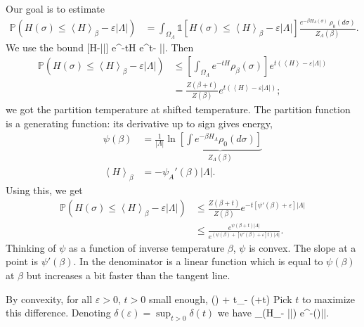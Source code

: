\documentclass[12pt]{book}
\theoremstyle{norm}
\begin{document}
Our goal is to estimate 
\begin{align*}
\mathbb{P}(H(\sigma)\le \left\langle {H}\right\rangle_\beta - \varepsilon |\Lambda|)
&=\int_{\Omega_\Lambda} \mathds{1}[H(\sigma)\le \left\langle {H}\right\rangle_\beta - \varepsilon |\Lambda|] \frac{e^{-\beta H_\Lambda(\sigma)}\,\rho_0(d\sigma)}{Z_{\Lambda}(\beta)}.
\end{align*}
We use the bound 
\be
{}[H\le \left{}\right\rangle-\varepsilon |\Lambda|] \le e^{-tH} e^{t\left{}\right\rangle - \varepsilon|\Lambda|}.
\ee
Then 
\begin{align*}
\mathbb{P}(H(\sigma)\le \left\langle {H}\right\rangle_\beta - \varepsilon |\Lambda|)
&\le \left[ {\int_{\Omega_\Lambda} e^{-tH}\rho_{\beta}(\sigma)} \right] e^{t(\left\langle {H}\right\rangle-\varepsilon|\Lambda|)}\\
&= \frac{Z(\beta+t)}{Z(\beta)}e^{t(\left\langle {H}\right\rangle-\varepsilon|\Lambda|)};
\end{align*}
we got the partition temperature at shifted temperature.
The partition function is a generating function: its derivative up to sign gives energy,
\begin{align*}
\psi(\beta) &= \frac{1}{|\Lambda|}\ln \underbrace{\left[ { \int e^{-\beta H_\Lambda} \rho_0(d\sigma)} \right]}_{Z_{\Lambda}(\beta)}\\
\left\langle {H}\right\rangle_\beta &= -\psi_A'(\beta) |\Lambda|.
\end{align*}
Using this, we get
\begin{align*}
\mathbb{P}(H(\sigma)\le \left\langle {H}\right\rangle_\beta - \varepsilon |\Lambda|)&\le 
\frac{Z(\beta+t)}{Z(\beta)}e^{-t[\psi'(\beta)+\varepsilon]|\Lambda|}\\
&\le \frac{e^{\psi(\beta+t)|\Lambda|}}{e^{(\psi(\beta) + [\psi'(\beta) + \varepsilon]t)|\Lambda|}}.%
\end{align*}
Thinking of $\psi$ as a function of inverse temperature $\beta$, $\psi$ is convex. The slope at a point is $\psi'(\beta)$. In the denominator is a linear function which is equal to $\psi(\beta)$ at $\beta$ but increases a bit faster than the tangent line.

By convexity, for all $\varepsilon>0$, $t>0$ small enough, %
\be
\psi(\beta) + t_ - \psi(\beta+t) 
\ee
Pick $t$ to maximize this difference. Denoting $\delta(\varepsilon)=\sup_{t>0}\delta(t)$ we have
\be
{}_\beta (H_\Lambda\le \left{}\right\rangle - \varepsilon|\Lambda|) \le e^{-\delta (\varepsilon)|\Lambda|}.
\ee
\end{document}
